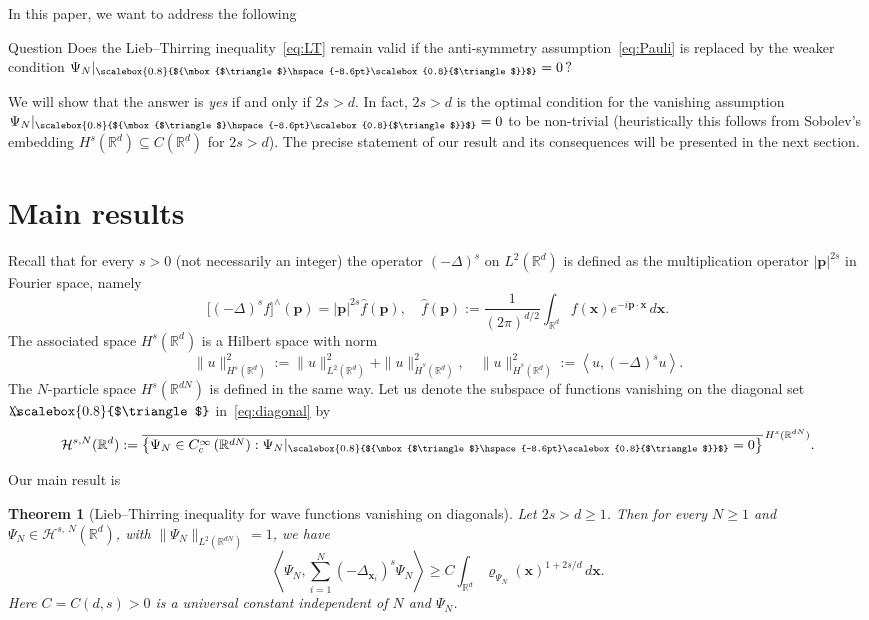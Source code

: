 \documentclass[10pt]{amsart}
\newtheorem{theo}{Theorem}[section]
\theoremstyle{definition}\newtheorem{defi}[theo]{Definition}\newtheorem{rema}[theo]{Remark}\newtheorem{exam}[theo]{Example}\newtheorem{exem}[theo]{Example}\newtheorem{nota}[theo]{Notation}
\newcommand*\R {\mathbb{R}}
\newcommand\1{{\ensuremath {\mathds 1} }}
\newcommand{\bp}{\mathbf{p}}
\newcommand{\bx}{\mathbf{x}}
\newcommand{\cH}{\mathcal{H}}
\newcommand{\bDelta}{{\mbox{$\triangle$}\hspace{-8.6pt}\scalebox{0.8}{$\triangle$}}}
\newcommand{\scriptbDelta}{\scalebox{0.8}{$\bDelta$}}
\begin{document}
In this paper, we want to address the following


\begin{enonce}[plain]{Question} Does the Lieb--Thirring inequality~\eqref{eq:LT} remain valid if the anti-symmetry assumption~\eqref{eq:Pauli} is replaced by the weaker condition $\Psi_N\rvert_{\scriptbDelta}=0\,?$
\end{enonce}

We will show that the answer is \emph{yes} if and only if $2s>d$. In fact, $2s>d$ is the optimal condition for the vanishing assumption $\Psi_N\rvert_{\scriptbDelta}=0$ to be non-trivial (heuristically this follows from Sobolev's embedding $ H^{s}(\R^d)\subseteq C(\R^d)$ for $2s>d$). The precise statement of our result and its consequences will be presented in the next section.

\section{Main results}

Recall that for every $s>0$ (not necessarily an integer) the operator $(-\Delta)^s$ on $L^2(\R^d)$ is defined as the multiplication operator $|\bp|^{2s}$ in Fourier space, namely
\[
\bigl[(-\Delta)^s f\bigr]^{\!\wedge\!}(\bp)= |\bp|^{2s} \widehat{f}(\bp),
\quad \widehat{f}(\bp):= \frac{1}{(2\pi)^{d/2}}\int_{\R^d}f(\bx)e^{-i\bp\cdot\bx}\,d\bx.
\]
The associated space $H^s(\R^d)$ is a Hilbert space with norm
\[
\|u\|_{H^s(\R^d)}^2 := \|u\|_{L^2(\R^d)}^2 + \|u\|_{\dot H^s(\R^d)}^2,
\quad
\|u\|_{\dot H^s(\R^d)}^2 := \left\langle u, (-\Delta)^s u\right\rangle.
\]
The $N$-particle space $H^s(\R^{dN})$ is defined in the same way. Let us denote the subspace of functions vanishing on the diagonal set $\bDelta$ in~\eqref{eq:diagonal} by
\[
\cH^{s,N}(\R^d):= \overline{\left\{ \Psi_N \in C_c^\infty\left(\R^{dN}\right): \Psi_N\rvert_{\scriptbDelta}=0 \right\}}^{\,H^s(\R^{dN})}.
\]

\goodbreak
Our main result is
\begin{theo}[Lieb--Thirring inequality for wave functions vanishing on diagonals] \label{thm:main}
Let $2s>d\ge 1$. Then for every $N \ge 1$ and $\Psi_N\in\cH^{s,\,N}(\R^d)$, with $\|\Psi_N\|_{L^2(\R^{dN})}=1$, we have
\begin{equation}\label{eq:LT-diagonal}
\left\langle \Psi_N, \sum_{i=1}^N (-\Delta_{\bx_i})^s\Psi_N \right\rangle
\ge C\int_{\R^d} \varrho_{\Psi_N}(\bx)^{1+2s/d} \,d\bx.
\end{equation}
Here $C=C(d,s)>0$ is a universal constant independent of $N$ and $\Psi_N$.
\end{theo}
\end{document}
